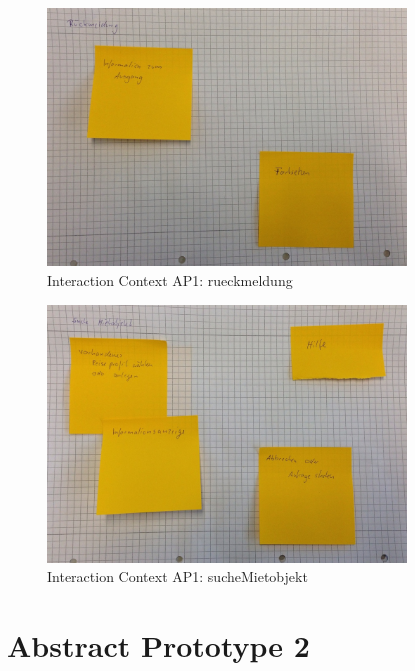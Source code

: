 \begin{figure}[H]
\centering
\includegraphics[width=0.85\textwidth]{./images/abstract/version1/rueckmeldung.JPG}
\caption{Interaction Context AP1: rueckmeldung}
\label{interfaceContents30}
\end{figure}

\begin{figure}[H]
\centering
\includegraphics[width=0.85\textwidth]{./images/abstract/version1/sucheMietobjekt.JPG}
\caption{Interaction Context AP1: sucheMietobjekt}
\label{interfaceContents31}
\end{figure}


\newpage
{}
\section*{Abstract Prototype 2}


